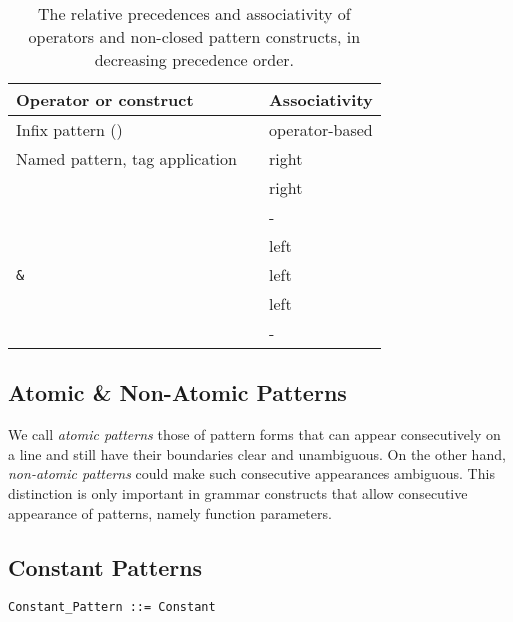 \begin{table}[h!]
  \caption{The relative precedences and associativity of operators and non-closed pattern constructs, in decreasing precedence order.}
\begin{center}
\begin{tabular}{l l}
  Operator or construct & Associativity \\ \hline \hline
  Infix pattern () & operator-based \\ \hline
  Named pattern, tag application\ \  & right \\ \hline
  \code{::} & right \\ \hline
  \code{=>} & - \\ \hline
  \code{,} & left \\ \hline
  \lstinline!&! & left \\ \hline
  \code{|} & left \\ \hline
   & - \\ \hline
\end{tabular}
\end{center}
\label{table:pattern-matching-op-precedences}
\end{table}%





\subsection{Atomic \& Non-Atomic Patterns}
\label{sec:atomic-patterns}
\label{sec:non-atomic-patterns}

We call {\em atomic patterns} those of pattern forms that can appear consecutively on a line and still have their boundaries clear and unambiguous. On the other hand, {\em non-atomic patterns} could make such consecutive appearances ambiguous. This distinction is only important in grammar constructs that allow consecutive appearance of patterns, namely function parameters. 





\subsection{Constant Patterns}
\label{sec:constant-patterns}

\grammar\begin{lstlisting}
Constant_Pattern ::= Constant
\end{lstlisting}


